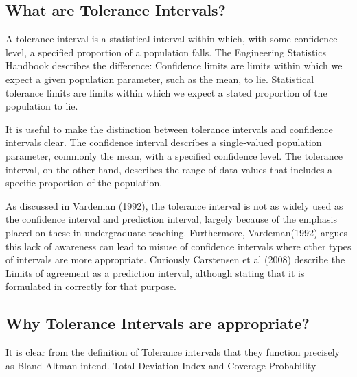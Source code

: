 \documentclass[Main.tex]{subfiles}
\begin{document}




\subsection*{What are Tolerance Intervals?}
A tolerance interval is a statistical interval within which, with some confidence level, a specified proportion of a population falls.
The Engineering Statistics Handbook describes the difference: Confidence limits are limits within which we expect a given population parameter, such as the mean, to lie. Statistical tolerance limits are limits within which we expect a stated proportion of the population to lie.
	
It is useful to make the distinction between tolerance intervals and confidence intervals clear. The confidence interval describes a single-valued population parameter, commonly the mean, with a specified confidence level. The tolerance interval, on the other hand, describes the range of data values that includes a specific proportion of the population.
	
As discussed in Vardeman (1992), the tolerance interval is not as widely used as the confidence interval and prediction interval, largely because of the emphasis placed on these in undergraduate teaching. Furthermore, Vardeman(1992) argues this lack of awareness can lead to misuse of confidence intervals where other types of intervals are more appropriate.
Curiously Carstensen et al (2008) describe the Limits of agreement as a prediction interval, although stating that it is formulated in correctly for that purpose.
	
\subsection*{Why Tolerance Intervals are appropriate?}
It is clear from the definition of Tolerance intervals that they function precisely as Bland-Altman intend.
	Total Deviation Index and Coverage Probability
	







\end{document}
